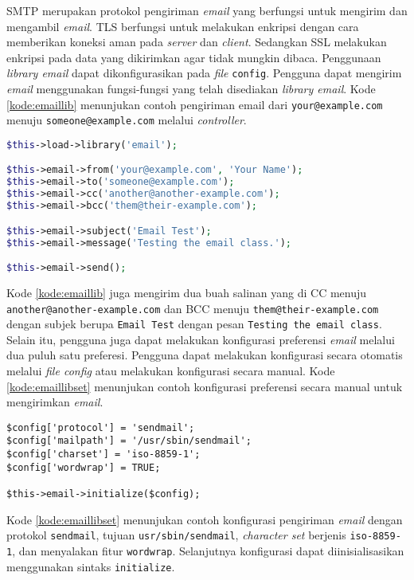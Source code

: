 SMTP merupakan protokol pengiriman \textit{email} yang berfungsi untuk mengirim dan mengambil \textit{email}. TLS berfungsi untuk melakukan enkripsi dengan cara memberikan koneksi aman pada \textit{server} dan \textit{client}. Sedangkan SSL melakukan enkripsi pada data yang dikirimkan agar tidak mungkin dibaca. Penggunaan \textit{library email} dapat dikonfigurasikan pada \textit{file} \texttt{config}. Pengguna dapat mengirim \textit{email} menggunakan fungsi-fungsi yang telah disediakan \textit{library email}. Kode \ref{kode:emaillib} menunjukan contoh pengiriman email dari \texttt{your@example.com} menuju \texttt{someone@example.com} melalui \textit{controller}.

\begin{lstlisting}[language=PHP, caption=Contoh pengiriman email melalui \textit{controller}, label=kode:emaillib]
$this->load->library('email');

$this->email->from('your@example.com', 'Your Name');
$this->email->to('someone@example.com');
$this->email->cc('another@another-example.com');
$this->email->bcc('them@their-example.com');

$this->email->subject('Email Test');
$this->email->message('Testing the email class.');

$this->email->send();
\end{lstlisting}

Kode \ref{kode:emaillib} juga mengirim dua buah salinan yang di CC menuju \texttt{another@another-example.com} dan BCC menuju \texttt{them@their-example.com} dengan subjek berupa \texttt{Email Test} dengan pesan \texttt{Testing the email class}. Selain itu, pengguna juga dapat melakukan konfigurasi preferensi \textit{email} melalui dua puluh satu preferesi. Pengguna dapat melakukan konfigurasi secara otomatis melalui \textit{file config} atau melakukan konfigurasi secara manual. Kode \ref{kode:emaillibset} menunjukan contoh konfigurasi preferensi secara manual untuk mengirimkan \textit{email}.

\begin{lstlisting}[caption=Contoh konfigurasi preferensi \textit{library email} secara manual, label=kode:emaillibset]
$config['protocol'] = 'sendmail';
$config['mailpath'] = '/usr/sbin/sendmail';
$config['charset'] = 'iso-8859-1';
$config['wordwrap'] = TRUE;

$this->email->initialize($config);
\end{lstlisting}
Kode \ref{kode:emaillibset} menunjukan contoh konfigurasi pengiriman \textit{email} dengan protokol \texttt{sendmail}, tujuan \texttt{usr/sbin/sendmail}, \textit{character set} berjenis \texttt{iso-8859-1}, dan menyalakan fitur \texttt{wordwrap}. Selanjutnya konfigurasi dapat diinisialisasikan menggunakan sintaks \texttt{initialize}.


